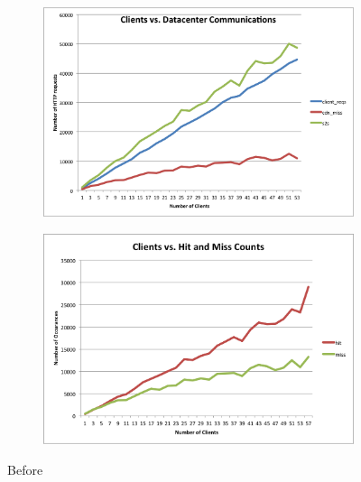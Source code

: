 \documentclass[conference]{IEEEtran}
\begin{document}
\begin{figure}[!h]
	\centering
	\begin{subfigure}[b]{0.49\columnwidth}
		\centering
		\includegraphics[width=\columnwidth]{figures/client-server.png}
	\end{subfigure}
	\begin{subfigure}[b]{0.49\columnwidth}
		\centering
		\includegraphics[width=\columnwidth]{figures/hit_miss_separate.png}
	\end{subfigure}
	\caption{Before}
\end{figure}
\end{document}
